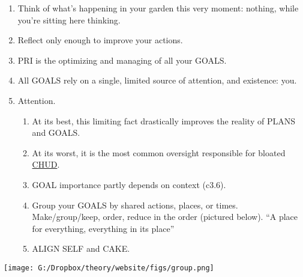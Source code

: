 \documentclass[
]{book}
\providecommand{\tightlist}{%
  \setlength{\itemsep}{0pt}\setlength{\parskip}{0pt}}
\begin{document}
\begin{enumerate}
\def\labelenumi{\arabic{enumi}.}
\setcounter{enumi}{30}
\item
  Think of what's happening in your garden this very moment: nothing, while
  you're sitting here thinking.
\item
  Reflect only enough to improve your actions.
\item
  PRI is the optimizing and managing of all your GOALS.
\item
  All GOALS rely on a single, limited source of attention, and existence: you.
\item
  Attention.

  \begin{enumerate}
  \def\labelenumii{\arabic{enumii}.}
  \tightlist
  \item
    At its best, this limiting fact drastically improves the reality of PLANS and GOALS.
  \item
    At its worst, it is the most common oversight responsible for bloated \protect\hyperlink{c.h.u.d.}{CHUD}.
  \item
    GOAL importance partly depends on context (c3.6).
  \item
    Group your GOALS by shared actions, places, or times. Make/group/keep,
    order, reduce in the order (pictured below). ``A place for everything,
    everything in its place''
  \item
    ALIGN SELF and CAKE.
  \end{enumerate}
\end{enumerate}

\texttt{[image: G:/Dropbox/theory/website/figs/group.png]}
\end{document}
